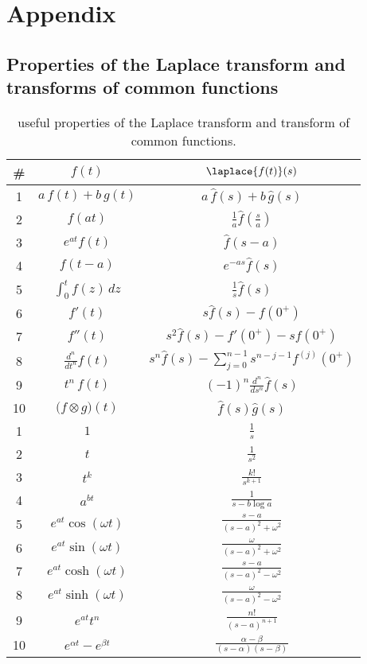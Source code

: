 
\chapter{Appendix}
\section{Properties of the Laplace transform and transforms of common functions}
	
	\begin{table}[bht]
	\centering
	\caption{useful properties of the Laplace transform and transform of common functions.} \label{app:lap:properties} \label{app:lap:transforms}
	\begin{tabular}{c |c |c}
		\# & $f(t)$ & $\laplace{f(t)}(s)$ \\ \hline
		1 & $a\, f(t) + b \, g(t)$ & $a \, \hat f(s) + b \, \hat g(s)$ \\ 
		2 & $f(at)$ & $\frac 1 a \hat f\left(\frac s a\right)$ \\
		3 & $e^{at}f(t)$ & $\hat f(s-a)$ \\
		4 & $f(t-a)$ & $e^{-as} \hat f(s)$ \\
		5 & $\int_0^t f(z)\, dz$ & $\frac 1 s \hat f(s)$ \\
		6 & $f'(t)$ & $s \hat f(s) - f(0^+)$ \\
		7 & $f''(t)$ & $s^2 \hat f(s) - f'(0^+) - s f(0^+)$ \\
		8 & $\frac {d^n}{dt^n}f(t)$ & $s^n \hat f(s) - \sum_{j=0}^{n-1} s^{n-j-1} f^{(j)}(0^+) $ \\
		9 & $t^n \, f(t)$ & $(-1)^n \frac{d^n}{ds^n} \hat f(s)$ \\
		10 & $\big(f\otimes g\big)(t)$ & $\hat f(s) \hat g(s)$ \\ \hline
		1 & $1$ & $\frac 1 s$ \\
		2 & $t$ & $\frac 1 {s^2}$ \\
		3 & $t^k$ & $\frac{k!}{s^{k+1}}$ \\
		4 & $a^{bt}$ & $\frac{1}{s - b\log a }$ \\
		5 & $e^{at} \cos(\omega t)$ & $\frac{s-a}{(s-a)^2 + \omega^2}$ \\
		6 & $e^{at} \sin(\omega t)$ & $\frac{\omega}{(s-a)^2 + \omega^2}$ \\
		7 & $e^{at} \cosh(\omega t)$ & $\frac{s-a}{(s-a)^2 - \omega^2}$ \\
		8 & $e^{at} \sinh(\omega t)$ & $\frac{\omega}{(s-a)^2 - \omega^2}$ \\
		9 & $e^{at} t^n$ & $\frac{n!}{(s-a)^{n+1}}$ \\
		10 & $e^{\alpha t} - e^{\beta t}$ & $\frac{\alpha - \beta}{(s- \alpha)(s-\beta)}$ 
		
	\end{tabular}
	\end{table}


